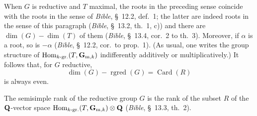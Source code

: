 When $G$ is reductive and $T$ maximal, the roots in the preceding sense coincide with the roots in the sense of \textit{Bible}, \S~12.2, def.~1; the latter are indeed roots in the sense of this paragraph (\textit{Bible}, \S~13.2, th.~1, c)) and there are $\dim(G)-\dim(T)$ of them (\textit{Bible}, \S~13.4, cor.~2 to th.~3). Moreover, if $\alpha$ is a root, so is $-\alpha$ (\textit{Bible}, \S~12.2, cor.~to prop.~1). (As usual, one writes the group structure of $\operatorname{Hom}_{k\text{-gr.}}(T,\mathbf{G}_{\mathrm m,k})$ indifferently additively or multiplicatively.) It follows that, for $G$ reductive,
\begin{equation}\tag{1.10.4}\label{XIX.eq.1.10.4}
\dim(G)-\operatorname{rgred}(G)=\operatorname{Card}(R)
\end{equation}
is always even.

The semisimple rank of the reductive group $G$ is the rank of the subset $R$ of the $\mathbf{Q}$-vector space $\operatorname{Hom}_{k\text{-gr.}}(T,\mathbf{G}_{\mathrm m,k})\otimes\mathbf{Q}$ (\textit{Bible}, \S~13.3, th.~2).

